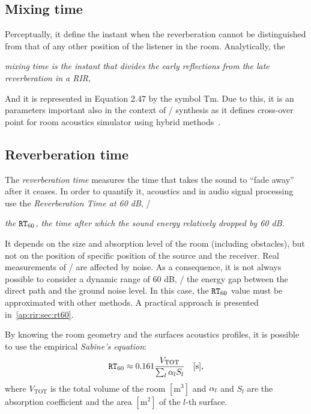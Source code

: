 \subsection{Mixing time}
Perceptually, it define the instant when the reverberation cannot be distinguished from that of any other position of the listener in the room.
Analytically,  the
\begin{center}
    \textit{\emph{mixing time} is the instant that divides the early reflections from the late reverberation in a RIR},
\end{center}
And it is represented in Equation 2.47 by the symbol Tm.
Due to this, it is an parameters important also in the context of \RIRs/ synthesis as it defines cross-over point for room acoustics simulator using hybrid methods~.

\subsection{Reverberation time}
The \textit{reverberation time} measures the time that takes the sound to ``fade away'' after it ceases.
In order to quantify it, acoustics and in audio signal processing use the \textit{Reverberation Time at 60 dB}, \ie/
\begin{center}
    \textit{the $\mathtt{RT}_{60}$, the time after which the sound energy relatively dropped by 60 dB.}
\end{center}
It depends on the size and absorption level of the room (including obstacles), but not on the position of specific position of the source and the receiver.
Real measurements of \RIRs/ are affected by noise.
As a consequence, it is not always possible to consider a dynamic range of 60 dB,
\ie/ the energy gap between the direct path and the ground noise level.
In this case, the $\mathtt{RT}_{60}$ value must be approximated with other methods.
A practical approach is presented in~\cref{ap:rir:sec:rt60}.

By knowing the room geometry and the surfaces acoustics profiles,
it is possible to use the empirical \textit{Sabine's equation}:
\begin{equation}
    \mathtt{RT}_{60}
    \approx 0.161 \frac{V_{\text{TOT}}}{\sum_l \alpha_l S_l} \hspace{1em} [\si{\second}]
    ,
\end{equation}
where $V_{\text{TOT}}$ is the total volume of the room $[\si{\metre^3}]$ and $\alpha_l$ and $S_l$ are the
absorption coefficient and the area $[\si{\metre^2}]$  of the $l$-th surface.

